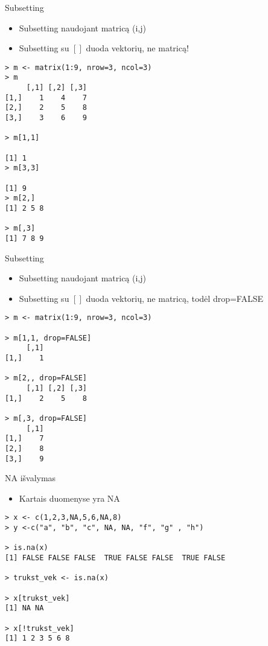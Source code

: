 \documentclass[11pt,xcolor=table]{beamer}
\begin{document}
\begin{frame}[fragile]{Subsetting}
\begin{itemize}
\item Subsetting naudojant matricą (i,j) 
\item Subsetting su $[]$ duoda vektorių, ne matricą!
\end{itemize}
\begin{lstlisting}
> m <- matrix(1:9, nrow=3, ncol=3)
> m
     [,1] [,2] [,3]
[1,]    1    4    7
[2,]    2    5    8
[3,]    3    6    9

> m[1,1]

[1] 1
> m[3,3]

[1] 9
> m[2,]
[1] 2 5 8

> m[,3]
[1] 7 8 9
\end{lstlisting}
\end{frame}

\begin{frame}[fragile]{Subsetting}
\begin{itemize}
\item Subsetting naudojant matricą (i,j) 
\item Subsetting su $[]$ duoda vektorių, ne matricą, todėl drop=FALSE
\end{itemize}
\begin{lstlisting}
> m <- matrix(1:9, nrow=3, ncol=3)

> m[1,1, drop=FALSE]
     [,1]
[1,]    1

> m[2,, drop=FALSE]
     [,1] [,2] [,3]
[1,]    2    5    8

> m[,3, drop=FALSE]
     [,1]
[1,]    7
[2,]    8
[3,]    9
\end{lstlisting}
\end{frame}



\begin{frame}[fragile]{NA išvalymas}
\begin{itemize}
\item Kartais duomenyse yra NA
\end{itemize}
\begin{lstlisting}
> x <- c(1,2,3,NA,5,6,NA,8)
> y <-c("a", "b", "c", NA, NA, "f", "g" , "h")

> is.na(x)
[1] FALSE FALSE FALSE  TRUE FALSE FALSE  TRUE FALSE

> trukst_vek <- is.na(x)

> x[trukst_vek]
[1] NA NA

> x[!trukst_vek]
[1] 1 2 3 5 6 8
\end{lstlisting}
\end{frame}
\end{document}
